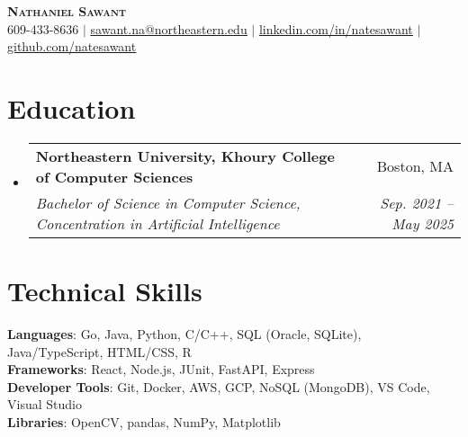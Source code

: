 \documentclass[letterpaper,11pt]{article}
\makeatletter
\newcommand{\resumeSubheading}[4]{
  \vspace{-2pt}\item
    \begin{tabular*}{0.97\textwidth}[t]{l@{\extracolsep{\fill}}r}
      \textbf{#1} & #2 \\
      \textit{\small#3} & \textit{\small #4} \\
    \end{tabular*}\vspace{-7pt}
}
\newcommand{\resumeSubHeadingListStart}{\begin{itemize}[leftmargin=0.15in, label={}]}
\newcommand{\resumeSubHeadingListEnd}{\end{itemize}}
\makeatother
\begin{document}

\begin{center}
  \textbf{\Huge \scshape Nathaniel Sawant} \\ \vspace{1pt}
  \small 609-433-8636 $|$ \href{mailto:sawant.na@northeastern.edu}{\underline{sawant.na@northeastern.edu}} $|$
  \href{https://linkedin.com/in/natesawant}{\underline{linkedin.com/in/natesawant}} $|$
  \href{https://github.com/natesawant}{\underline{github.com/natesawant}}
\end{center}


\section{Education}
\resumeSubHeadingListStart
\resumeSubheading
{Northeastern University, Khoury College of Computer Sciences}{Boston, MA}
{Bachelor of Science in Computer Science, Concentration in Artificial Intelligence}{Sep. 2021 -- May 2025}
\resumeSubHeadingListEnd


%
\section{Technical Skills}
\begin{itemize}[leftmargin=0.15in, label={}]
  \small{\item{
        \textbf{Languages}{: Go, Java, Python, C/C++, SQL (Oracle, SQLite), Java/TypeScript, HTML/CSS, R} \\
        \textbf{Frameworks}{: React, Node.js, JUnit, FastAPI, Express} \\
        \textbf{Developer Tools}{: Git, Docker, AWS, GCP, NoSQL (MongoDB), VS Code, Visual Studio} \\
        \textbf{Libraries}{: OpenCV, pandas, NumPy, Matplotlib}
        }}
\end{itemize}
\end{document}
